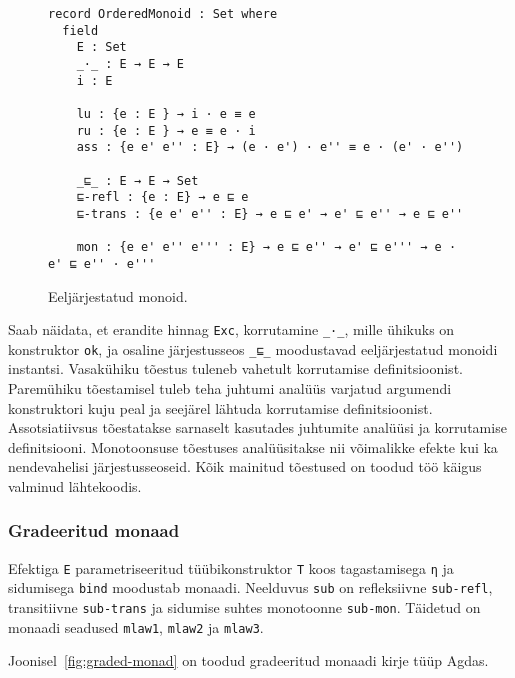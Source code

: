 \documentclass[a4paper,12pt]{article}
\begin{document}
\begin{figure}
  \begin{BVerbatim}
record OrderedMonoid : Set where
  field
    E : Set
    _·_ : E → E → E    
    i : E

    lu : {e : E } → i · e ≡ e
    ru : {e : E } → e ≡ e · i 
    ass : {e e' e'' : E} → (e · e') · e'' ≡ e · (e' · e'')
    
    _⊑_ : E → E → Set    
    ⊑-refl : {e : E} → e ⊑ e
    ⊑-trans : {e e' e'' : E} → e ⊑ e' → e' ⊑ e'' → e ⊑ e''

    mon : {e e' e'' e''' : E} → e ⊑ e'' → e' ⊑ e''' → e · e' ⊑ e'' · e'''
  \end{BVerbatim}
  \caption{Eeljärjestatud monoid.}
  \label{fig:ordered-monoid}
\end{figure}

Saab näidata, et erandite hinnag {\tt Exc},
korrutamine {\tt _·_}, mille ühikuks on konstruktor {\tt ok},
ja osaline järjestusseos {\tt _⊑_} moodustavad eeljärjestatud monoidi instantsi.
Vasakühiku tõestus tuleneb vahetult korrutamise definitsioonist.
Paremühiku tõestamisel tuleb teha juhtumi analüüs varjatud argumendi konstruktori kuju peal
ja seejärel lähtuda korrutamise definitsioonist.
Assotsiatiivsus tõestatakse sarnaselt kasutades juhtumite analüüsi ja korrutamise definitsiooni. Monotoonsuse tõestuses analüüsitakse nii võimalikke efekte kui ka nendevahelisi järjestusseoseid.
Kõik mainitud tõestused on toodud töö käigus valminud lähtekoodis.


\subsubsection{Gradeeritud monaad}

Efektiga {\tt E} parametriseeritud tüübikonstruktor {\tt T} koos tagastamisega {\tt η} ja sidumisega {\tt bind}  moodustab monaadi.
Neelduvus {\tt sub} on refleksiivne {\tt sub-refl}, transitiivne {\tt sub-trans} ja  sidumise suhtes monotoonne {\tt sub-mon}.
Täidetud on monaadi seadused {\tt mlaw1}, {\tt mlaw2} ja {\tt mlaw3}.

Joonisel~\ref{fig:graded-monad} on toodud gradeeritud monaadi kirje tüüp Agdas.
\end{document}
